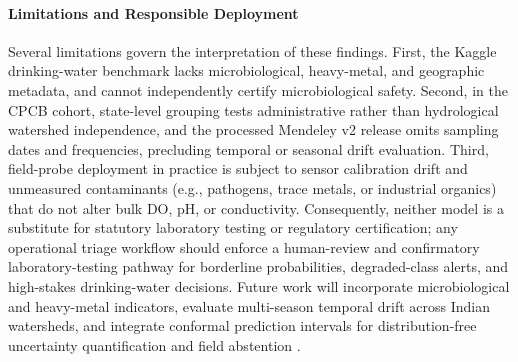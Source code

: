 \documentclass[pdflatex,sn-mathphys-num]{sn-jnl}%
\theoremstyle{thmstyleone}%
\theoremstyle{thmstyletwo}%
\theoremstyle{thmstylethree}%
\begin{document}
\paragraph{Limitations and Responsible Deployment}
Several limitations govern the interpretation of these findings. First, the Kaggle drinking-water benchmark lacks microbiological, heavy-metal, and geographic metadata, and cannot independently certify microbiological safety. Second, in the CPCB cohort, state-level grouping tests administrative rather than hydrological watershed independence, and the processed Mendeley v2 release omits sampling dates and frequencies, precluding temporal or seasonal drift evaluation. Third, field-probe deployment in practice is subject to sensor calibration drift and unmeasured contaminants (e.g., pathogens, trace metals, or industrial organics) that do not alter bulk DO, pH, or conductivity. Consequently, neither model is a substitute for statutory laboratory testing or regulatory certification; any operational triage workflow should enforce a human-review and confirmatory laboratory-testing pathway for borderline probabilities, degraded-class alerts, and high-stakes drinking-water decisions. Future work will incorporate microbiological and heavy-metal indicators, evaluate multi-season temporal drift across Indian watersheds, and integrate conformal prediction intervals for distribution-free uncertainty quantification and field abstention \cite{vovk2005,angelopoulos2021}.

\backmatter

\newpage

\end{document}
